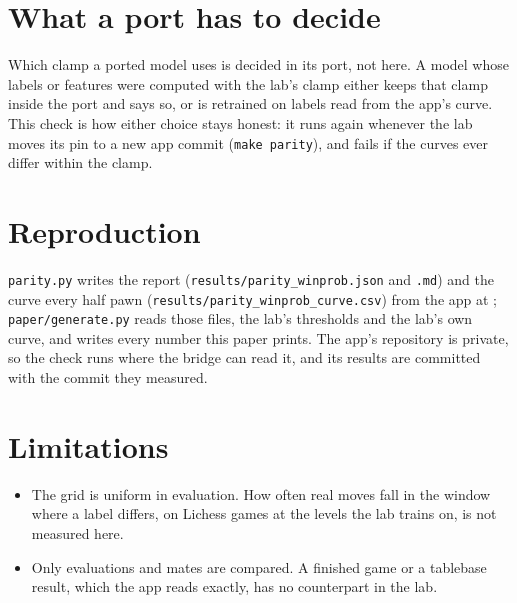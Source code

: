 \documentclass[11pt]{article}
\begin{document}
\section{What a port has to decide}

Which clamp a ported model uses is decided in its port, not here. A model whose labels or
features were computed with the lab's clamp either keeps that clamp inside the port and says so,
or is retrained on labels read from the app's curve. This check is how either choice stays
honest: it runs again whenever the lab moves its pin to a new app commit (\texttt{make parity}),
and fails if the curves ever differ within the clamp.

\section{Reproduction}

\texttt{parity.py} writes the report (\texttt{results/parity\_winprob.json} and \texttt{.md}) and
the curve every half pawn (\texttt{results/parity\_winprob\_curve.csv}) from the app at
\AppCommit; \texttt{paper/generate.py} reads those files, the lab's thresholds and the lab's own
curve, and writes every number this paper prints. The app's repository is private, so the check
runs where the bridge can read it, and its results are committed with the commit they measured.

\section{Limitations}

\begin{itemize}[nosep]
\item The grid is uniform in evaluation. How often real moves fall in the window where a label
differs, on Lichess games at the levels the lab trains on, is not measured here.
\item Only evaluations and mates are compared. A finished game or a tablebase result, which the
app reads exactly, has no counterpart in the lab.
\end{itemize}
\end{document}
